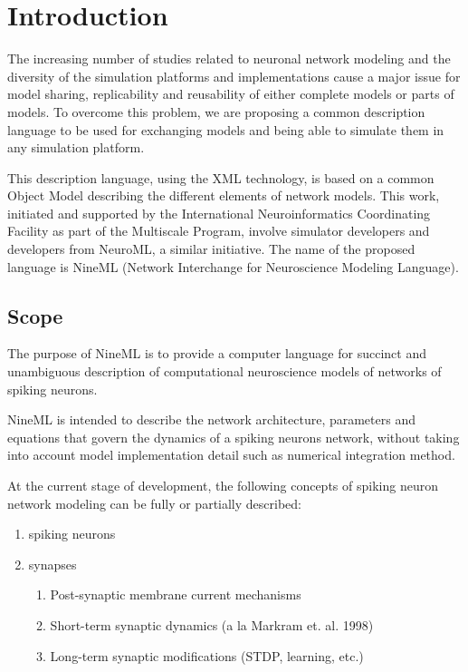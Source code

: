 \documentclass{article}
\begin{document}
\section{Introduction}

The increasing number of studies related to neuronal network modeling
and the diversity of the simulation platforms and implementations
cause a major issue for model sharing, replicability and reusability
of either complete models or parts of models. To overcome this problem, we are proposing a
common description language to be used for exchanging models and being
able to simulate them in any simulation platform.

This description language, using the XML technology, is based on a
common Object Model describing the different elements of network
models. This work, initiated and supported by the International
Neuroinformatics Coordinating Facility as part of the Multiscale
Program, involve simulator developers and developers from NeuroML, a
similar initiative.  The name of the proposed language is NineML
(Network Interchange for Neuroscience Modeling Language).

\subsection{Scope}

The purpose of NineML is to provide a computer language for
succinct and unambiguous description of computational neuroscience models of
networks of spiking neurons.

NineML is intended to describe the network architecture, parameters
and equations that govern the dynamics of a spiking neurons network, without taking into account model implementation detail such as numerical integration method.

At the current stage of development, the following concepts of spiking neuron
network modeling can be fully or partially described:

\begin{enumerate}
\item spiking neurons
\item synapses
\begin{enumerate}
\item Post-synaptic membrane current mechanisms
\item Short-term synaptic dynamics (a la Markram et. al. 1998)
\item Long-term synaptic modifications (STDP, learning, etc.)
\end{enumerate}
\end{enumerate}
\end{document}
